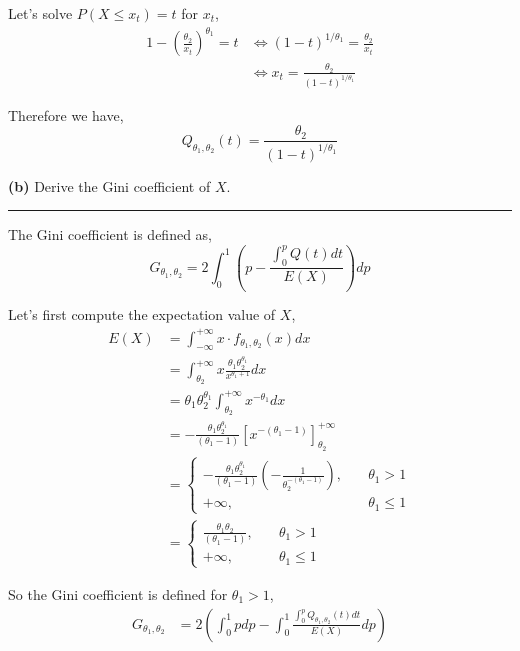 Let's solve $P(X \leq x_t) = t$ for $x_t$,
\begin{align*}
  1 - \left( \frac{\theta_2}{x_t} \right)^{\theta_1} = t 
    &\iff (1 - t)^{1/\theta_1}
      = \frac{\theta_2}{x_t}\\
    &\iff x_t 
      = \frac{\theta_2}{(1 - t)^{1/\theta_1}}
\end{align*}

Therefore we have, 
\begin{equation}
  Q_{\theta_1, \theta_2}(t) = \frac{\theta_2}{(1 - t)^{1/\theta_1}}
\end{equation}

\textbf{(b)} Derive the Gini coefficient of $X$.

\begin{center}\rule{6cm}{0.4pt}\end{center}

The Gini coefficient is defined as, 
\begin{equation}
  G_{\theta_1, \theta_2} = 2 \int_{0}^{1} \left( p - \frac{\int_{0}^{p} Q(t) dt}{E(X)} \right) dp
\end{equation}

Let's first compute the expectation value of $X$,
\begin{align*}
  E(X)
    &= \int_{-\infty}^{+\infty} x \cdot f_{\theta_1, \theta_2}(x) dx \\
    &= \int_{\theta_2}^{+\infty} x \frac{\theta_1 \theta_2^{\theta_1}}{x^{\theta_1 + 1}} dx \\
    &= \theta_1 \theta_2^{\theta_1} \int_{\theta_2}^{+\infty} x^{- \theta_1} dx \\
    &= - \frac{\theta_1 \theta_2^{\theta_1}}{(\theta_1 - 1)} \left[ x^{-(\theta_1 - 1)} \right]_{\theta_2}^{+\infty} \\
    &= \begin{cases}
      - \frac{\theta_1 \theta_2^{\theta_1}}{(\theta_1 - 1)} \left( - \frac{1}{\theta_2^{-(\theta_1 - 1)}} \right), &\quad \theta_1 > 1 \\
      +\infty, &\quad \theta_1 \leq 1
    \end{cases} \\
    &= \begin{cases}
      \frac{\theta_1 \theta_2}{(\theta_1 - 1)}, &\quad \theta_1 > 1 \\
      +\infty, &\quad \theta_1 \leq 1
    \end{cases}
\end{align*}

So the Gini coefficient is defined for $\theta_1 > 1$, 
\begin{align*}
  G_{\theta_1, \theta_2}
    &= 2 \left( \int_{0}^{1} p dp - \int_{0}^{1} \frac{\int_{0}^{p} Q_{\theta_1, \theta_2}(t) dt}{E(X)} dp \right) 
\end{align*}


